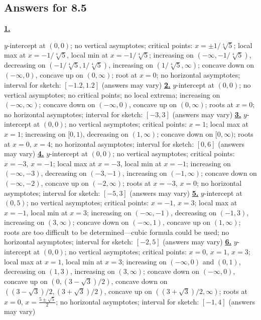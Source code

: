 \subsection *{Answers for 8.5}
\hypertarget {a:8.5.1}{\hyperlink {e:8.5.1}{\bfseries 1.}} \mdseries $y$-intercept at $(0,0)$; no vertical asymptotes; critical points: $x=\pm 1/\sqrt [4]{5}$; local max at $x=-1/\sqrt [4]{5}$, local min at $x=-1/\sqrt [4]{5}$; increasing on $(-\infty ,-1/\sqrt [4]{5})$, decreasing on $(-1/\sqrt [4]{5},1/\sqrt [4]{5})$, increasing on $(1/\sqrt [4]{5},\infty )$; concave down on $(-\infty ,0)$, concave up on $(0, \infty )$; root at $x=0$; no horizontal asymptotes; interval for sketch: $[-1.2,1.2]$ (answers may vary)\qquad 
\hypertarget {a:8.5.2}{\hyperlink {e:8.5.2}{\bfseries 2.}} \mdseries $y$-intercept at $(0,0)$; no vertical asymptotes; no critical points; no local extrema; increasing on $(-\infty ,\infty )$; concave down on $(-\infty ,0)$, concave up on $(0, \infty )$; roots at $x=0$; no horizontal asymptotes; interval for sketch: $[-3,3]$ (answers may vary)\qquad 
\hypertarget {a:8.5.3}{\hyperlink {e:8.5.3}{\bfseries 3.}} \mdseries $y$-intercept at $(0,0)$; no vertical asymptotes; critical points: $x= 1$; local max at $x=1$; increasing on $[0,1)$, decreasing on $(1,\infty )$; concave down on $[0,\infty )$; roots at $x=0$, $x=4$; no horizontal asymptotes; interval for sketch: $[0,6]$ (answers may vary)\qquad 
\hypertarget {a:8.5.4}{\hyperlink {e:8.5.4}{\bfseries 4.}} \mdseries $y$-intercept at $(0,0)$; no vertical asymptotes; critical points: $x=-3$, $x= -1$; local max at $x=-3$, local min at $x=-1$; increasing on $(-\infty ,-3)$, decreasing on $(-3,-1)$, increasing on $(-1,\infty )$; concave down on $(-\infty ,-2)$, concave up on $(-2, \infty )$; roots at $x=-3$, $x=0$; no horizontal asymptotes; interval for sketch: $[-5,3]$ (answers may vary)\qquad 
\hypertarget {a:8.5.5}{\hyperlink {e:8.5.5}{\bfseries 5.}} \mdseries $y$-intercept at $(0,5)$; no vertical asymptotes; critical points: $x=-1$, $x= 3$; local max at $x=-1$, local min at $x=3$; increasing on $(-\infty ,-1)$, decreasing on $(-1,3)$, increasing on $(3,\infty )$; concave down on $(-\infty ,1)$, concave up on $(1, \infty )$; roots are too difficult to be determined---cubic formula could be used; no horizontal asymptotes; interval for sketch: $[-2,5]$ (answers may vary)\qquad 
\hypertarget {a:8.5.6}{\hyperlink {e:8.5.6}{\bfseries 6.}} \mdseries $y$-intercept at $(0,0)$; no vertical asymptotes; critical points: $x=0$, $x=1$, $x=3$; local max at $x=1$, local min at $x=3$; increasing on $(-\infty ,0)$ and $(0,1)$, decreasing on $(1,3)$, increasing on $(3,\infty )$; concave down on $(-\infty ,0)$, concave up on $(0, (3-\sqrt {3})/2)$, concave down on $((3-\sqrt {3})/2,(3+\sqrt {3})/2)$, concave up on $((3+\sqrt {3})/2,\infty )$; roots at $x=0$, $x= \frac {5\pm \sqrt {5}}{2}$; no horizontal asymptotes; interval for sketch: $[-1,4]$ (answers may vary)\qquad 
